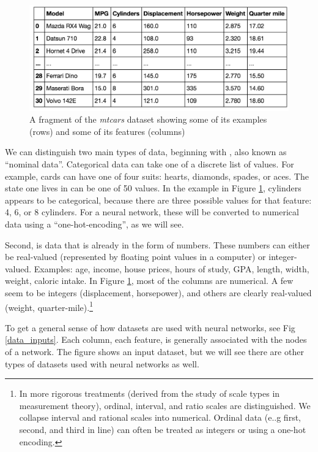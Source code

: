 \begin{figure}[h]
\centering
\includegraphics[scale=0.6]{./images/CarsBase.png}
\caption[Screenshot of the Motor Trend Car Road Tests dataset included with R.]{A fragment of  the \emph {mtcars} dataset showing some of its examples (rows) and some of its features (columns) }
\label{cars_dataset}
\end{figure}

We can distinguish two main types of data, beginning with , also known as ``nominal data''. Categorical data can take one of a discrete list of values. For example, cards can have one of four suits: hearts, diamonds, spades, or aces. The state one lives in can be one of 50 values. In the example in  Figure \ref{cars_dataset}, cylinders appears to be categorical, because there are three possible values for that feature: 4, 6, or 8 cylinders. For a neural network, these will be converted to numerical data using a ``one-hot-encoding'', as we will see. 

Second,  is data that is already in the form of numbers. These numbers can either be real-valued (represented by floating point values in a computer) or integer-valued. Examples: age, income, house prices, hours of study, GPA, length, width, weight, caloric intake. In Figure \ref{cars_dataset}, most of the columns are numerical. A few seem to be integers (displacement, horsepower), and others are clearly real-valued (weight, quarter-mile).\footnote{ In more rigorous treatments (derived from the study of scale types in measurement theory), ordinal, interval, and ratio scales are distinguished. We collapse interval and rational scales into numerical. Ordinal data (e..g first, second, and third in line) can often be treated as integers or using a one-hot encoding.}

To get a general sense of how datasets are used with neural networks, see Fig \ref{data_inputs}. Each column, each feature, is generally associated with the nodes of a network. The figure shows an input dataset, but we will see there are other types of datasets used with neural networks as well.

